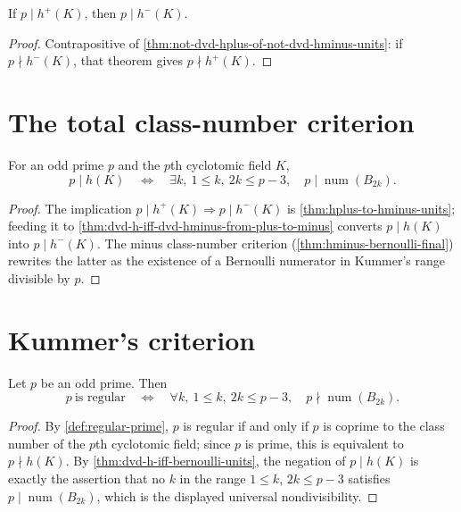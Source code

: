 \begin{theorem}\label{thm:hplus-to-hminus-units}
  \leanok
If $p\mid h^+(K)$, then $p\mid h^-(K)$.
\end{theorem}
\begin{proof}\leanok
Contrapositive of \cref{thm:not-dvd-hplus-of-not-dvd-hminus-units}: if
$p\nmid h^-(K)$, that theorem gives $p\nmid h^+(K)$.
\end{proof}

\section{The total class-number criterion}

\begin{theorem}\label{thm:dvd-h-iff-bernoulli-units}
  \leanok
For an odd prime $p$ and the $p$th cyclotomic field $K$,
\[
  p\mid h(K)
  \quad\Longleftrightarrow\quad
  \exists k,\ 1\le k,\ 2k\le p-3,\quad
  p\mid\operatorname{num}(B_{2k}).
\]
\end{theorem}
\begin{proof}\leanok
The implication $p\mid h^+(K)\Rightarrow p\mid h^-(K)$ is
\cref{thm:hplus-to-hminus-units}; feeding it to
\cref{thm:dvd-h-iff-dvd-hminus-from-plus-to-minus} converts $p\mid h(K)$
into $p\mid h^-(K)$.  The minus class-number criterion
(\cref{thm:hminus-bernoulli-final}) rewrites the latter as the existence of
a Bernoulli numerator in Kummer's range divisible by $p$.
\end{proof}

\section{Kummer's criterion}

\begin{theorem}\label{thm:kummer-criterion}
  \leanok
Let $p$ be an odd prime.  Then
\[
  p\ \text{is regular}
  \quad\Longleftrightarrow\quad
  \forall k,\ 1\le k,\ 2k\le p-3,\quad
  p\nmid\operatorname{num}(B_{2k}).
\]
\end{theorem}
\begin{proof}\leanok
By \cref{def:regular-prime}, $p$ is regular if and only if $p$ is coprime
to the class number of the $p$th cyclotomic field; since $p$ is prime,
this is equivalent to $p\nmid h(K)$.  By
\cref{thm:dvd-h-iff-bernoulli-units}, the negation of $p\mid h(K)$ is
exactly the assertion that no $k$ in the range $1\le k$, $2k\le p-3$
satisfies $p\mid\operatorname{num}(B_{2k})$, which is the displayed
universal nondivisibility.
\end{proof}
